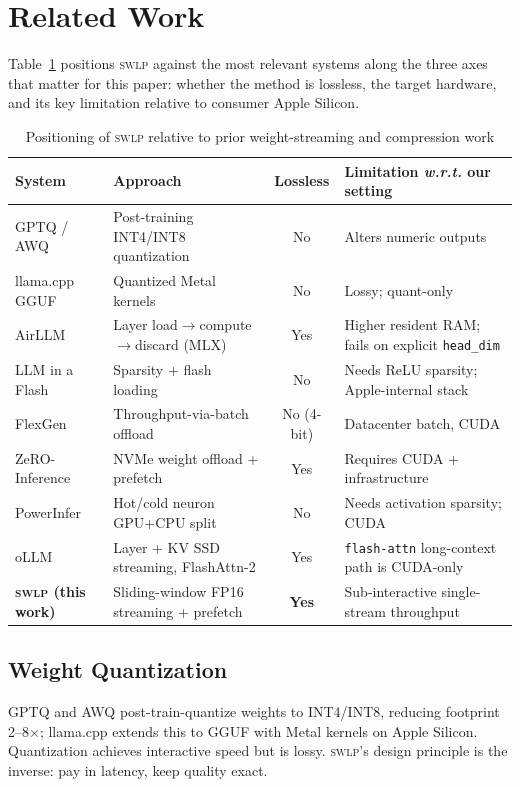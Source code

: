 \documentclass[10pt,a4paper]{article}
\newcommand{\swlp}{\textsc{swlp}}
\newcommand{\wrt}{\textit{w.r.t.}}
\begin{document}
\section{Related Work}
\label{sec:related}

Table~\ref{tab:related} positions \swlp{} against the most relevant systems along
the three axes that matter for this paper: whether the method is lossless, the
target hardware, and its key limitation relative to consumer Apple Silicon.

\begin{table}[htbp]
\centering
\caption{Positioning of \swlp{} relative to prior weight-streaming and
compression work}
\label{tab:related}
\small
\begin{tabular}{@{}p{2.6cm}p{3.3cm}cp{3.6cm}@{}}
\toprule
\textbf{System} & \textbf{Approach} & \textbf{Lossless} & \textbf{Limitation \wrt{} our setting} \\
\midrule
GPTQ / AWQ \cite{frantar2023gptq,lin2023awq} & Post-training INT4/INT8 quantization & No & Alters numeric outputs \\
llama.cpp GGUF \cite{gerganov2023llama} & Quantized Metal kernels & No & Lossy; quant-only \\
AirLLM \cite{guo2023airllm} & Layer load$\to$\allowbreak compute$\to$\allowbreak discard (MLX) & Yes & Higher resident RAM; fails on explicit \texttt{head\_dim} \\
LLM in a Flash \cite{alizadeh2023llmflash} & Sparsity + flash loading & No & Needs ReLU sparsity; Apple-internal stack \\
FlexGen \cite{sheng2023flexgen} & Throughput-via-batch offload & No (4-bit) & Datacenter batch, CUDA \\
ZeRO-Inference \cite{rajbhandari2021zero} & NVMe weight offload + prefetch & Yes & Requires CUDA + infrastructure \\
PowerInfer \cite{song2023powerinfer} & Hot/cold neuron GPU+CPU split & No & Needs activation sparsity; CUDA \\
oLLM \cite{ollm2025} & Layer + KV SSD streaming, FlashAttn-2 & Yes & \texttt{flash-attn} long-context path is CUDA-only \\
\textbf{\swlp{} (this work)} & Sliding-window FP16 streaming + prefetch & \textbf{Yes} & Sub-interactive single-stream throughput \\
\bottomrule
\end{tabular}
\end{table}

\subsection{Weight Quantization}
GPTQ \cite{frantar2023gptq} and AWQ \cite{lin2023awq} post-train-quantize weights
to INT4/INT8, reducing footprint 2--8$\times$; llama.cpp \cite{gerganov2023llama}
extends this to GGUF with Metal kernels on Apple Silicon. Quantization achieves
interactive speed but is lossy. \swlp{}'s design principle is the inverse: pay in
latency, keep quality exact.
\end{document}
